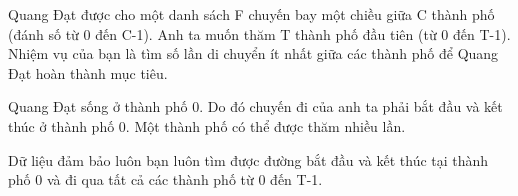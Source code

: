 Quang Đạt được cho một danh sách F chuyến bay một chiều giữa C thành phố (đánh số từ 0 đến C-1). Anh ta muốn thăm T thành phố đầu tiên (từ 0 đến T-1). Nhiệm vụ của bạn là tìm số lần di chuyển ít nhất giữa các thành phố để Quang Đạt hoàn thành mục tiêu.  

   Quang Đạt sống ở thành phố 0. Do đó chuyến đi của anh ta phải bắt đầu và kết thúc ở thành phố 0. Một thành phố có thể được thăm nhiều lần.  

   Dữ liệu đảm bảo luôn bạn luôn tìm được đường bắt đầu và kết thúc tại thành phố 0 và đi qua tất cả các thành phố từ 0 đến T-1.